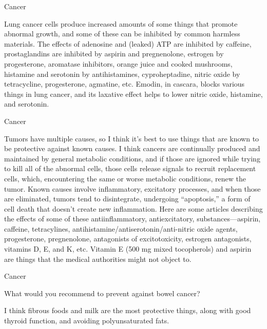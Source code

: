 \documentclass[11pt,oneside,openany,extrafontsizes]{memoir}
\begin{document}
\begin{standalonequote}{Cancer}

    \begin{answer}
      Lung cancer cells produce increased amounts of some things that promote abnormal growth, and some of these can be inhibited by common harmless materials. The effects of adenosine and (leaked) ATP are inhibited by caffeine, prostaglandins are inhibited by aspirin and pregnenolone, estrogen by progesterone, aromatase inhibitors, orange juice and cooked mushrooms, histamine and serotonin by antihistamines, cyproheptadine, nitric oxide by tetracycline, progesterone, agmatine, etc. Emodin, in cascara, blocks various things in lung cancer, and its laxative effect helps to lower nitric oxide, histamine, and serotonin.
    \end{answer}
\end{standalonequote}

\begin{standalonequote}{Cancer}

    \begin{answer}
       Tumors have multiple causes, so I think it's best to use things that are known to be protective against known causes. I think cancers are continually produced and maintained by general metabolic conditions, and if those are ignored while trying to kill all of the abnormal cells, those cells release signals to recruit replacement cells, which, encountering the same or worse metabolic conditions, renew the tumor. Known causes involve inflammatory, excitatory processes, and when those are eliminated, tumors tend to disintegrate, undergoing \enquote{apoptosis,} a form of cell death that doesn't create new inflammation. Here are some articles describing the effects of some of these antiinflammatory, antiexcitatory, substances—aspirin, caffeine, tetracylines, antihistamine/antiserotonin/anti-nitric oxide agents, progesterone, pregnenolone, antagonists of excitotoxicity, estrogen antagonists, vitamins D, E, and K, etc. Vitamin E (500 mg mixed tocopherols) and aspirin are things that the medical authorities might not object to.
    \end{answer}
\end{standalonequote}

\begin{qaexchange}{Cancer}

    \begin{question}
        What would you recommend to prevent against bowel cancer?
    \end{question}

    \begin{answer}
       I think fibrous foods and milk are the most protective things, along with good thyroid function, and avoiding polyunsaturated fats. 
    \end{answer}
\end{qaexchange}
\end{document}
